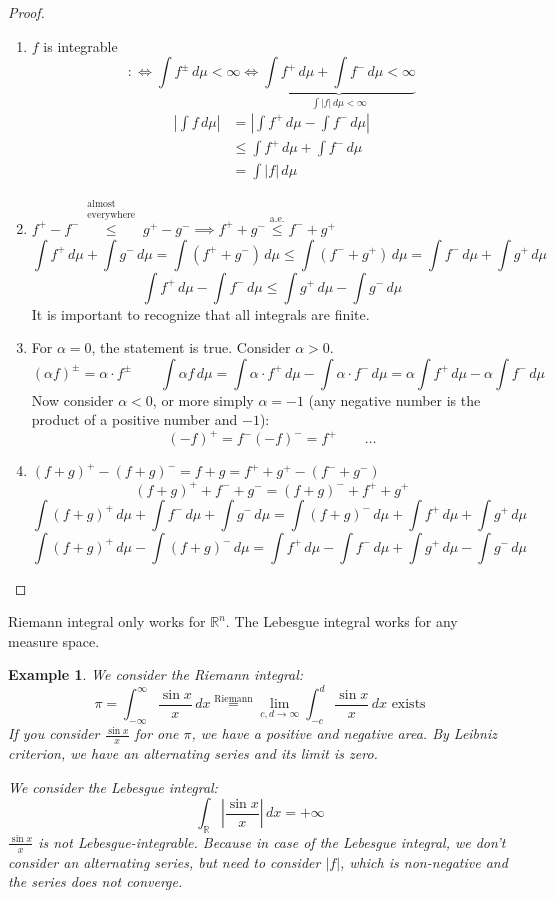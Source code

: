 \documentclass[a4paper]{article}
\newcounter{lecref}[section]
\numberwithin{lecref}{section}
\theoremstyle{break}
\newtheorem{example}[lecref]{Example}
\newcommand{\Abs}[1]{\left|#1\right|}
\begin{document}
\begin{proof}
  \begin{enumerate}
    \item $f$ is integrable
      \[ :\iff \int f^{\pm} \, d\mu < \infty \iff \underbrace{\int f^+ \, d\mu + \int f^- \, d\mu < \infty}_{\int \Abs{f} \, d\mu < \infty} \]
      \begin{align*}
        \Abs{\int f \, d\mu} &= \Abs{\int f^+ \, d\mu - \int f^- \, d\mu} \\
          &\leq \int f^+ \, d\mu + \int f^- \, d\mu \\
          &= \int \Abs{f} \, d\mu
      \end{align*}
    \item $f^+ - f^- \overset{\substack{\text{almost} \\ \text{everywhere}}}{\leq} g^+ - g^- \implies f^+ + g^- \overset{\text{a.e.}}{\leq} f^- + g^+$
      \[ \int f^+ \, d\mu + \int g^- \, d\mu = \int (f^+ + g^-) \, d\mu \leq \int \left(f^- + g^+\right) \, d\mu = \int f^- \, d\mu + \int g^+ \, d\mu \]
      \[ \int f^+ \, d\mu - \int f^- \, d\mu \leq \int g^+ \, d\mu - \int g^- \, d\mu \]
      It is important to recognize that all integrals are finite.
    \item For $\alpha = 0$, the statement is true. Consider $\alpha > 0$.
      \[ (\alpha f)^{\pm} = \alpha \cdot f^{\pm} \qquad \int \alpha f \, d\mu = \int \alpha \cdot f^+ \, d\mu - \int \alpha \cdot f^- \, d\mu = \alpha \int f^+ \, d\mu - \alpha \int f^- \, d\mu \]
      Now consider $\alpha < 0$, or more simply $\alpha = -1$ (any negative number is the product of a positive number and $-1$):
      \[ (-f)^+ = f^- (-f)^- = f^+ \qquad \dots \]
    \item $(f + g)^+ - (f + g)^- = f + g = f^+ + g^+ - (f^- + g^-)$
      \[ (f + g)^+ + f^- + g^- = (f + g)^- + f^+ + g^+ \]
      \[ \int (f + g)^+ \, d\mu + \int f^- \, d\mu + \int g^- \, d\mu = \int (f + g)^- \, d\mu + \int f^+ \, d\mu + \int g^+ \, d\mu \]
      \[ \int (f + g)^+ \, d\mu - \int (f + g)^- \, d\mu = \int f^+ \, d\mu - \int f^- \, d\mu + \int g^+ \, d\mu - \int g^- \, d\mu \]
  \end{enumerate}
\end{proof}

Riemann integral only works for $\mathbb R^n$.
The Lebesgue integral works for any measure space.

\begin{example}
  We consider the Riemann integral:
  \[ \pi = \int_{-\infty}^\infty \frac{\sin{x}}{x} \, dx \overset{\text{Riemann}}{=} \lim_{c,d\to \infty} \int_{-c}^d \frac{\sin{x}}{x} \, dx \text{ exists} \]
  If you consider $\frac{\sin{x}}{x}$ for one $\pi$, we have a positive and negative area.
  By Leibniz criterion, we have an alternating series and its limit is zero.

  We consider the Lebesgue integral:
  \[ \int_{\mathbb R} \Abs{\frac{\sin{x}}{x}} \, dx = +\infty \]
  $\frac{\sin{x}}{x}$ is not Lebesgue-integrable.
  Because in case of the Lebesgue integral, we don't consider an alternating series, but need to consider $\Abs{f}$, which is non-negative and the series does not converge.
\end{example}
\end{document}
